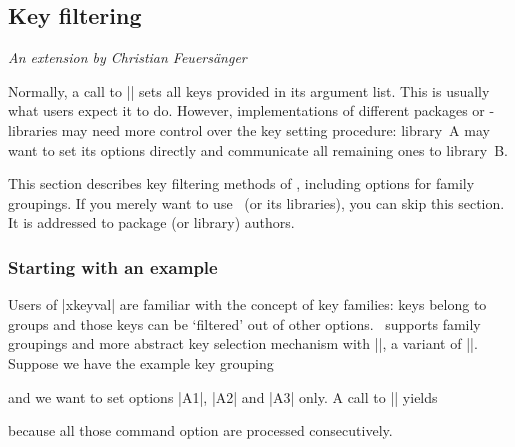\subsection{Key filtering}
\begingroup

{\small \emph{An extension by Christian Feuers\"anger}}
\vspace{0.4cm}%

\noindent
Normally, a call to |\pgfkeys| sets all keys provided in its argument list. This is usually what users expect it to do. However, implementations of different packages or \pgfname-libraries may need more control over the key setting procedure: library~A may want to set its options directly and communicate all remaining ones to library~B.

This section describes key filtering methods of \pgfname, including options for family groupings. If you merely want to use \pgfname\ (or its libraries), you can skip this section. It is addressed to package (or library) authors.

\subsubsection{Starting with an example}
\label{section-key-filter-example}
Users of |xkeyval| are familiar with the concept of key families: keys belong to groups and those keys can be `filtered' out of other options. \pgfname\ supports family groupings and more abstract key selection mechanism with |\pgfkeysfiltered|, a variant of |\pgfkeys|. Suppose we have the example key grouping

%
\begin{codeexample}
\end{codeexample}

\noindent and we want to set options |A1|, |A2| and |A3| only. A call to |\pgfkeys| yields
\begin{codeexample}[]
\end{codeexample}
\noindent because all those command option are processed consecutively.


